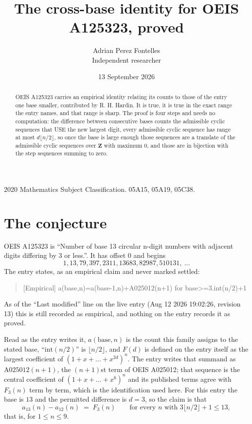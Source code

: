 \documentclass[11pt,a4paper]{article}
\title{The cross-base identity for OEIS A125323, proved}
\author{Adrian Perez Fontelles\\ \small Independent researcher}
\date{13 September 2026}
\theoremstyle{plain}
\theoremstyle{definition}
\begin{document}
\maketitle

\begin{abstract}
OEIS A125323 carries an empirical identity relating its counts to those of the entry one base
smaller, contributed by R. H. Hardin. It is true, it is true in the exact range the entry
names, and that range is sharp. The proof is four steps and needs no computation: the
difference between consecutive bases counts the admissible cyclic sequences that USE the new
largest digit, every admissible cyclic sequence has range at most $d\lfloor n/2\rfloor$, so
once the base is large enough those sequences are a translate of the admissible cyclic
sequences over $\mathbf{Z}$ with maximum $0$, and those are in bijection with the step
sequences summing to zero.
\end{abstract}

\noindent\small 2020 Mathematics Subject Classification. 05A15, 05A19, 05C38.\normalsize

\section{The conjecture}

OEIS A125323 is ``Number of base 13 circular n-digit numbers with adjacent digits differing by 3 or less.''. It has offset $0$ and begins
\[
1, 13, 79, 397, 2311, 13683, 82987, 510131,\ \dots
\]
The entry states, as an empirical claim and never marked settled:
\begin{quote}
[Empirical] a(base,n)=a(base-1,n)+A025012(n+1) for base>=3.int(n/2)+1
\end{quote}
As of the ``Last modified'' line on the live entry (Aug 12 2026 19:02:26, revision 13)
this is still recorded as empirical, and nothing on the entry records it as proved.

Read as the entry writes it, $a(\mathrm{base},n)$ is the count this family assigns to the
stated base, ``$\mathrm{int}(n/2)$'' is $\lfloor n/2\rfloor$, and $F(d)$ is defined on the
entry itself as the largest coefficient of $(1+x+\dots+x^{2d})^{n}$. The entry writes that summand as $\mathrm{A025012}(n+1)$, the $(n+1)$st term of OEIS A025012; that sequence is the central coefficient of $(1+x+\dots+x^{6})^{n}$ and its published terms agree with $F_{3}(n)$ term by term, which is the identification used here. For this entry
the base is $13$ and the permitted difference is $d=3$, so the claim is that
\[
a_{13}(n)-a_{12}(n)\;=\;F_{3}(n)
\qquad\text{for every } n \text{ with } 3\lfloor n/2\rfloor+1\le13,
\]
that is, for $1\le n\le9$.
\end{document}
